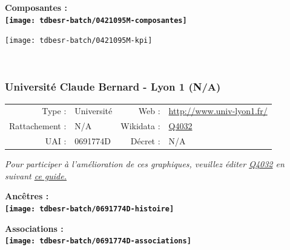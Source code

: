 \documentclass[12pt,french,]{article}
\begin{document}
\hrulefill

\begin{center} \bf Composantes : \\  
\texttt{[image: tdbesr-batch/0421095M-composantes]} \end{center}

\begin{center}\texttt{[image: tdbesr-batch/0421095M-kpi]} \end{center}\checkoddpage

\ifoddpage ~\newpage \fi   

\hypertarget{universituxe9-claude-bernard---lyon-1-na}{%
\subsubsection{Université Claude Bernard - Lyon 1
(N/A)}\label{universituxe9-claude-bernard---lyon-1-na}}

\begin{tabular*}{\textwidth}{rp{5cm}rl}  
\hline  
Type : & Université & Web : &\href{http://www.univ-lyon1.fr/}{http://www.univ-lyon1.fr/} \\  
Rattachement : & N/A & Wikidata : & \href{https://www.wikidata.org/entity/Q4032}{Q4032} \\  
UAI : & 0691774D & Décret : & N/A \\  
\hline  
\end{tabular*}

\textit{\scriptsize Pour participer à l'amélioration de ces graphiques, veuillez éditer  \href{https://www.wikidata.org/entity/Q4032}{Q4032}  en suivant \href{https://github.com/cpesr/wikidataESR/blob/master/Rmd/wikidataESR.md}{ce guide.}}

\vspace{1cm}  
\begin{minipage}[b]{0.50\textwidth}\begin{center} \bf Ancêtres : \\  
\texttt{[image: tdbesr-batch/0691774D-histoire]} \end{center}\end{minipage}\begin{minipage}[b]{0.50\textwidth}\begin{center} \bf Associations : \\  
\texttt{[image: tdbesr-batch/0691774D-associations]} \end{center}\end{minipage}

\hrulefill
\end{document}

